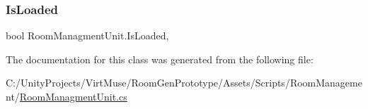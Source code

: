 \subsubsection{\texorpdfstring{Is\+Loaded}{IsLoaded}}
{\footnotesize\ttfamily bool Room\+Managment\+Unit.\+Is\+Loaded\hspace{0.3cm}{\ttfamily [get]}, {}}



The documentation for this class was generated from the following file\+:\begin{DoxyCompactItemize}
\item 
C\+:/\+Unity\+Projects/\+Virt\+Muse/\+Room\+Gen\+Prototype/\+Assets/\+Scripts/\+Room\+Management/\mbox{\hyperlink{_room_managment_unit_8cs}{Room\+Managment\+Unit.\+cs}}\end{DoxyCompactItemize}
